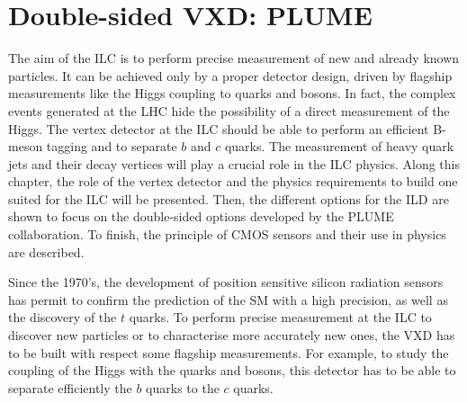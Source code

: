 \chapter{Double-sided VXD: PLUME}
\label{chap:vxd}


  The aim of the \gls{ILC} is to perform precise measurement of new and already known particles. 
  It can be achieved only by a proper detector design, driven by flagship measurements like the Higgs coupling to quarks and bosons.
  In fact, the complex events generated at the \gls{LHC} hide the possibility of a direct measurement of the Higgs.
  The vertex detector at the \gls{ILC} should be able to perform an efficient B-meson tagging and to separate $b$ and $c$ quarks.
  The measurement of heavy quark jets and their decay vertices will play a crucial role in the \gls{ILC} physics.
  Along this chapter, the role of the vertex detector and the physics requirements to build one suited for the \gls{ILC} will be presented.
  Then, the different options for the \gls{ILD} are shown to focus on the double-sided options developed by the PLUME collaboration.
  To finish, the principle of \gls{CMOS} sensors and their use in physics are described.

  Since the 1970's, the development of position sensitive silicon radiation sensors has permit to confirm the prediction of the \gls{SM} with a high precision, as well as the discovery of the $t$ quarks.
  To perform precise measurement at the \gls{ILC} to discover new particles or to characterise more accurately new ones, the \gls{VXD} has to be built with respect some flagship measurements.
  For example, to study the coupling of the Higgs with the quarks and bosons, this detector has to be able to separate efficiently the $b$ quarks to the $c$ quarks.


